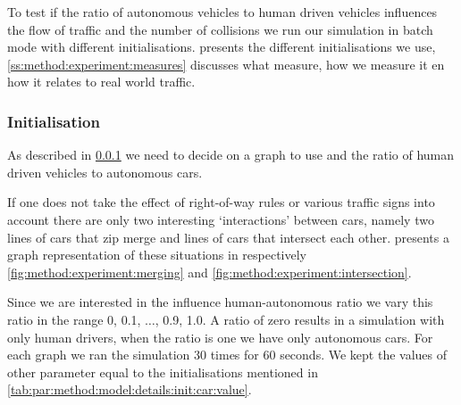 To test if the ratio of autonomous vehicles to human driven vehicles influences the flow of traffic and the number of collisions we run our simulation in batch mode with different initialisations.  presents the different initialisations we use, \cref{ss:method:experiment:measures} discusses what measure, how we measure it en how it relates to real world traffic. 

\subsubsection{Initialisation}
\label{ss:method:experiment:init}
As described in \cref{ss:method:experiment:init} we need to decide on a graph to use and the ratio of human driven vehicles to autonomous cars. 

If one does not take the effect of right-of-way rules or various traffic signs into account there are only two interesting `interactions' between cars, namely two lines of cars that zip merge and lines of cars that intersect each other.  presents a graph representation of these situations in respectively \cref{fig:method:experiment:merging} and \cref{fig:method:experiment:intersection}.

Since we are interested in the influence human-autonomous ratio we vary this ratio in the range 0, 0.1, $\dotsc$, 0.9, 1.0. A ratio of zero results in a simulation with only human drivers, when the ratio is one we have only autonomous cars. For each graph we ran the simulation 30 times for 60 seconds. We kept the values of other parameter equal to the initialisations mentioned in \cref{tab:par:method:model:details:init:car:value}.

